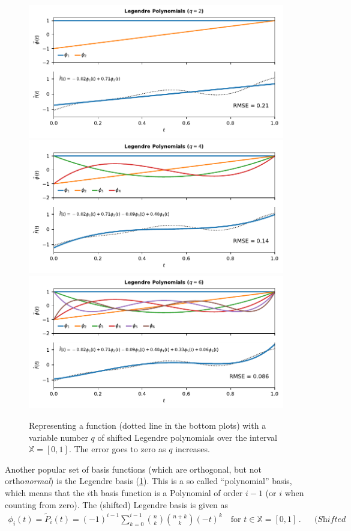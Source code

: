\documentclass[10pt,letterpaper,oneside]{article}
\begin{document}
\begin{figure}[p]
	\centering
	\includegraphics[scale=0.95]{media/legendre_q2.pdf}
	\includegraphics[scale=0.95]{media/legendre_q4.pdf}
	\includegraphics[scale=0.95]{media/legendre_q6.pdf}
	\caption{Representing a function (dotted line in the bottom plots) with a variable number $q$ of shifted Legendre polynomials over the interval $\mathbb{X} = [0, 1]$. The error goes to zero as $q$ increases.}
	\label{fig:legendre}
\end{figure}
Another popular set of basis functions (which are orthogonal, but not ortho\emph{normal}) is the Legendre basis (\cref{fig:legendre}). This is a so called \enquote{polynomial} basis, which means that the $i$th basis function is a Polynomial of order $i - 1$ (or $i$ when counting from zero). The (shifted) Legendre basis is given as
\begin{align}
	\phi_i(t) = \tilde P_i(t) = (-1)^{i - 1} \sum_{k=0}^{i - 1} \binom{n}{k} \binom{n + k}{k} (-t)^{k} \quad \text{for } t \in \mathbb{X} = [0, 1]\,. && \textit{(Shifted Legendre Basis)}
	\label{eqn:legendre}
\end{align}
\end{document}
